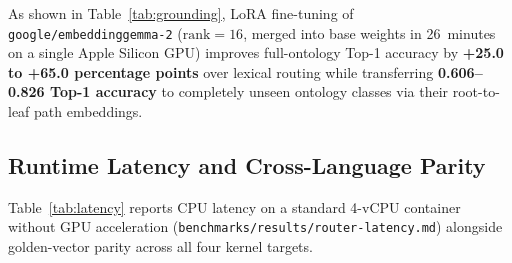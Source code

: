 \documentclass[11pt,a4paper]{article}
\begin{document}
\begin{table}[ht!]
\centering
\caption{Full-ontology Top-1 accuracy and runtime axiom violation rate across batch-disjoint and unseen class-disjoint splits.}
\label{tab:grounding}
\vspace{0.4em}
\end{table}

As shown in Table~\ref{tab:grounding}, LoRA fine-tuning of \texttt{google/embeddinggemma-2} ($\mathrm{rank} = 16$, merged into base weights in 26~minutes on a single Apple Silicon GPU) improves full-ontology Top-1 accuracy by \textbf{+25.0 to +65.0 percentage points} over lexical routing while transferring \textbf{0.606--0.826 Top-1 accuracy} to completely unseen ontology classes via their root-to-leaf path embeddings.

\subsection{Runtime Latency and Cross-Language Parity}

Table~\ref{tab:latency} reports CPU latency on a standard 4-vCPU container without GPU acceleration (\texttt{benchmarks/results/router-latency.md}) alongside golden-vector parity across all four kernel targets.
\end{document}
